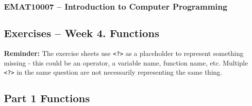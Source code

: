 \documentclass[11pt]{report}
\begin{document}
\subsubsection*{EMAT10007 -- Introduction to Computer Programming}
\subsection*{\Large Exercises -- Week 4. Functions}

 \textbf{Reminder:} The exercise sheets use {\tt <?>} as a placeholder to represent something missing - this could be an operator, a variable name, function name, etc. Multiple {\tt <?>} in the same question are not necessarily representing the same thing.

 \subsection*{\Large Part 1 Functions}
 
\end{document}
